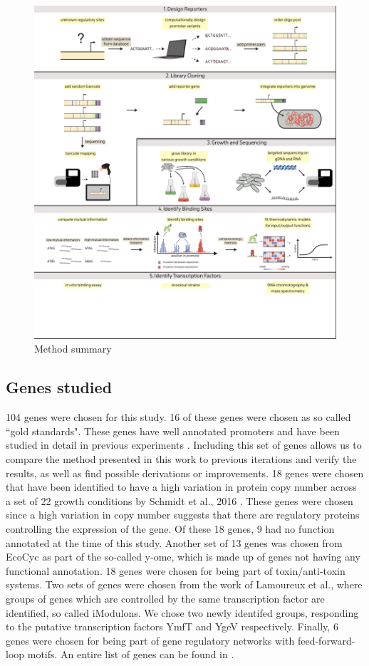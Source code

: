 \begin{figure}
    \centering
    \includegraphics{../figures/figure2_method_sum.pdf}
    \caption{Method summary}
    \label{fig:method_sum}
\end{figure}

\subsection{Genes studied}
104 genes were chosen for this study. 16 of these genes were chosen as so called ``gold standards". These genes have well annotated promoters and have been studied in detail in previous experiments \cite{belliveau2018systematic,ireland2020deciphering}. Including this set of genes allows us to compare the method presented in this work to previous iterations and verify the results, as well as find possible derivations or improvements. 18 genes were chosen that have been identified to have a high variation in protein copy number across a set of 22 growth conditions by Schmidt et al., 2016 \cite{schmidt2016quantitative}. These genes were chosen since a high variation in copy number suggests that there are regulatory proteins controlling the expression of the gene. Of these 18 genes, 9 had no function annotated at the time of this study. Another set of 13 genes was chosen from EcoCyc as part of the so-called y-ome\cite{ghatak2019ome}, which is made up of genes not having any functional annotation. 18 genes were chosen for being part of toxin/anti-toxin systems. Two sets of genes were chosen from the work of Lamoureux et al.\cite{lamoureux2021precise}, where groups of genes which are controlled by the same transcription factor are identified, so called iModulons. We chose two newly identifed groups, responding to the putative transcription factors YmfT and YgeV respectively. Finally, 6 genes were chosen for being part of gene regulatory networks with feed-forward-loop motifs. An entire list of genes can be found in .


